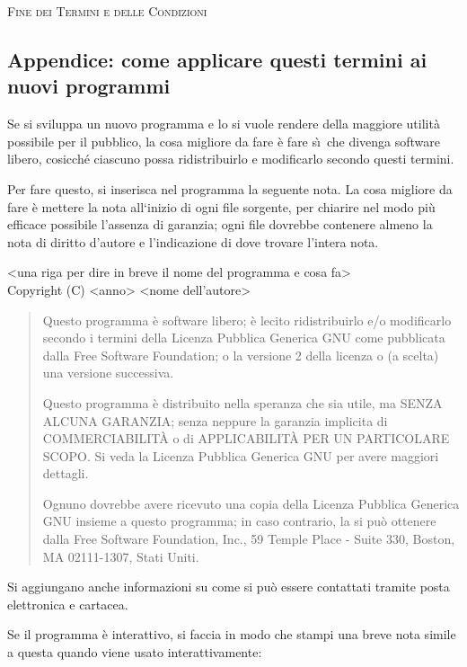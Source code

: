 \begin{center}
  \Large \textsc{Fine dei Termini e delle Condizioni}
\end{center}

\subsection*{Appendice: come applicare questi termini ai
  nuovi programmi}
Se si sviluppa un nuovo programma e lo si vuole rendere
della maggiore utilit\`a possibile per il pubblico, la cosa
migliore da fare \`e fare s\`\i\ che divenga software
libero, cosicch\'e ciascuno possa ridistribuirlo e
modificarlo secondo questi termini.

Per fare questo, si inserisca nel programma la seguente
nota. La cosa migliore da fare \`e mettere la nota
all`inizio di ogni file sorgente, per chiarire nel modo
pi\`u efficace possibile l'assenza di garanzia; ogni file
dovrebbe contenere almeno la nota di diritto d'autore e
l'indicazione di dove trovare l'intera nota.

\begin{center}
  <una riga per dire in breve il nome del programma e cosa
  fa> \\
  Copyright (C) <anno> <nome dell'autore>
\end{center}
\begin{quote}
  Questo programma \`e software libero; \`e lecito
  ridistribuirlo e/o modificarlo secondo i termini della
  Licenza Pubblica Generica GNU come pubblicata dalla Free
  Software Foundation; o la versione 2 della licenza o (a
  scelta) una versione successiva.

  Questo programma \`e distribuito nella speranza che sia
  utile, ma SENZA ALCUNA GARANZIA; senza neppure la garanzia
  implicita di COMMERCIABILIT\`A o di APPLICABILIT\`A PER UN
  PARTICOLARE SCOPO.  Si veda la Licenza Pubblica Generica
  GNU per avere maggiori dettagli.

  Ognuno dovrebbe avere ricevuto una copia della Licenza
  Pubblica Generica GNU insieme a questo programma; in caso
  contrario, la si pu\`o ottenere dalla Free Software
  Foundation, Inc., 59 Temple Place - Suite 330, Boston, MA
  02111-1307, Stati Uniti.
\end{quote}

Si aggiungano anche informazioni su come si pu\`o essere
contattati tramite posta elettronica e cartacea.

Se il programma \`e interattivo, si faccia in modo che
stampi una breve nota simile a questa quando viene usato
interattivamente:

